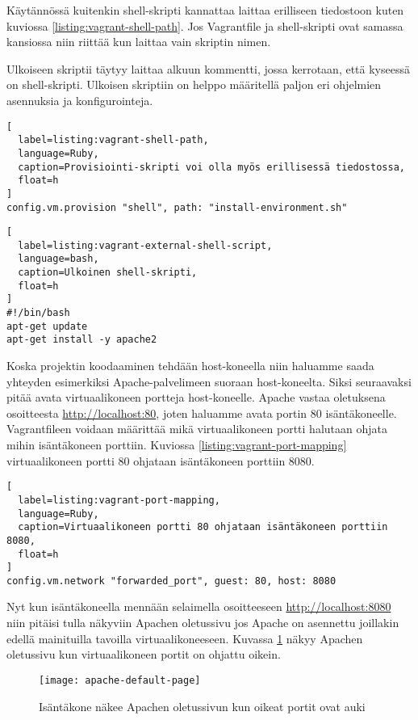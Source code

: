 Käytännössä kuitenkin shell-skripti kannattaa laittaa erilliseen tiedostoon kuten kuviossa \ref{listing:vagrant-shell-path}. Jos Vagrantfile ja shell-skripti ovat samassa kansiossa niin riittää kun laittaa vain skriptin nimen.

Ulkoiseen skriptii täytyy laittaa alkuun kommentti, jossa kerrotaan, että kyseessä on shell-skripti. Ulkoisen skriptiin on helppo määritellä paljon eri ohjelmien asennuksia ja konfigurointeja.

\begin{lstlisting}[
  label=listing:vagrant-shell-path,
  language=Ruby,
  caption=Provisiointi-skripti voi olla myös erillisessä tiedostossa,
  float=h
]
config.vm.provision "shell", path: "install-environment.sh"
\end{lstlisting}

\begin{lstlisting}[
  label=listing:vagrant-external-shell-script,
  language=bash,
  caption=Ulkoinen shell-skripti,
  float=h
]
#!/bin/bash
apt-get update
apt-get install -y apache2
\end{lstlisting}

Koska projektin koodaaminen tehdään host-koneella niin haluamme saada yhteyden esimerkiksi Apache-palvelimeen suoraan host-koneelta. Siksi seuraavaksi pitää avata virtuaalikoneen portteja host-koneelle. Apache vastaa oletuksena osoitteesta \url{http://localhost:80}, joten haluamme avata portin 80 isäntäkoneelle. Vagrantfileen voidaan määrittää mikä virtuaalikoneen portti halutaan ohjata mihin isäntäkoneen porttiin. Kuviossa \ref{listing:vagrant-port-mapping} virtuaalikoneen portti 80 ohjataan isäntäkoneen porttiin 8080.

\begin{lstlisting}[
  label=listing:vagrant-port-mapping,
  language=Ruby,
  caption=Virtuaalikoneen portti 80 ohjataan isäntäkoneen porttiin 8080,
  float=h
]
config.vm.network "forwarded_port", guest: 80, host: 8080
\end{lstlisting}

Nyt kun isäntäkoneella mennään selaimella osoitteeseen \url{http://localhost:8080} niin pitäisi tulla näkyviin Apachen oletussivu jos Apache on asennettu joillakin edellä mainituilla tavoilla virtuaalikoneeseen. Kuvassa \ref{fig:apache-default-page} näkyy Apachen oletussivu kun virtuaalikoneen portit on ohjattu oikein.

\begin{figure}[h]
  \texttt{[image: apache-default-page]}
  \caption{Isäntäkone näkee Apachen oletussivun kun oikeat portit ovat auki}
  \label{fig:apache-default-page}
\end{figure}

